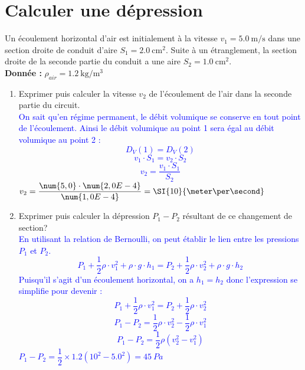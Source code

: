 \documentclass[a4paper,11pt,fleqn,usenames,dvipsnames]{article}%
\begin{document}
\section{Calculer une dépression}
Un écoulement  horizontal d'air est initialement à la vitesse $v_1=\SI{5,0}{\meter\per\second}$ dans une section droite de conduit d'aire $S_1=\SI{2,0}{\centi\meter\squared}$. Suite à un étranglement, la section droite de la seconde partie du conduit a une aire $S_2=\SI{1,0}{\centi\meter\squared}$.\\
\textbf{Donnée :} $\rho_{air} =\SI{1,2}{\kilo\gram\per\meter\cubed}$
\begin{enumerate}
	\item Exprimer puis calculer la vitesse $v_2$ de l'écoulement de l'air dans la seconde partie du circuit.\\
	\textcolor{blue}{On sait qu'en régime permanent, le débit volumique se conserve en tout point de l'écoulement. Ainsi le débit volumique au point 1 sera égal au débit volumique au point 2 :
	$$D_V(1) = D_V(2)$$
	$$v_1 \cdot S_1 = v_2 \cdot S_2$$
	$$v_2 = \dfrac{v_1 \cdot S_1}{S_2}$$
	 $v_2 = \dfrac{\num{5,0} \cdot \num{2,0E-4}}{\num{1,0E-4}} = \SI{10}{\meter\per\second}$
	}
	\item Exprimer puis calculer la dépression $P_1-P_2$ résultant de ce changement de section?\\
	\textcolor{blue}{En utilisant la relation de Bernoulli, on peut établir le lien entre les pressions $P_1$ et $P_2$.
	$$ P_1 + \dfrac{1}{2} \rho \cdot v_1^2 + \rho\cdot g \cdot h_1 = P_2 + \dfrac{1}{2} \rho \cdot v_2^2 + \rho\cdot g \cdot h_2$$
	Puisqu'il s'agit  d'un écoulement horizontal, on a $h_1=h_2$ donc l'expression se simplifie pour devenir : 
	$$ P_1 + \dfrac{1}{2} \rho \cdot v_1^2 = P_2 + \dfrac{1}{2} \rho \cdot v_2^2$$
	$$ P_1 - P_2 = \dfrac{1}{2} \rho \cdot v_2^2 - \dfrac{1}{2} \rho \cdot v_1^2$$
	$$ P_1 - P_2 = \dfrac{1}{2} \rho (v_2^2 -v_1^2)$$
	 $ P_1 - P_2 = \dfrac{1}{2} \times \num{1,2} (\num{10}^2 -\num{5,0}^2) = \SI{45}{Pa} $
	}
\end{enumerate}
\end{document}
